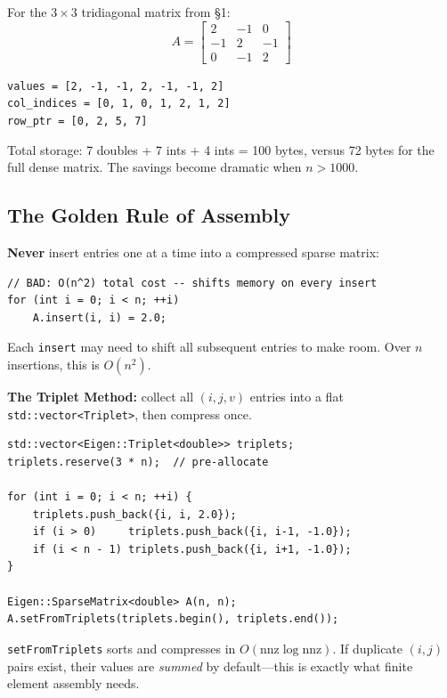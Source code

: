 \begin{example}
For the $3\times 3$ tridiagonal matrix from \S1:
\[
    A = \begin{bmatrix} 2 & -1 & 0 \\ -1 & 2 & -1 \\ 0 & -1 & 2 \end{bmatrix}
\]
\begin{center}
\texttt{values = [2, -1, -1, 2, -1, -1, 2]} \\
\texttt{col\_indices = [0, 1, 0, 1, 2, 1, 2]} \\
\texttt{row\_ptr = [0, 2, 5, 7]}
\end{center}
Total storage: 7 doubles + 7 ints + 4 ints = 100 bytes, versus
72 bytes for the full dense matrix.  The savings become dramatic
when $n > 1000$.
\end{example}

\subsection{The Golden Rule of Assembly}

\begin{warningbox}
\textbf{Never} insert entries one at a time into a compressed sparse matrix:
\begin{lstlisting}
// BAD: O(n^2) total cost -- shifts memory on every insert
for (int i = 0; i < n; ++i)
    A.insert(i, i) = 2.0;
\end{lstlisting}
Each \texttt{insert} may need to shift all subsequent entries to make room.
Over $n$ insertions, this is $O(n^2)$.
\end{warningbox}

\textbf{The Triplet Method:} collect all $(i, j, v)$ entries into a flat
\texttt{std::vector<Triplet>}, then compress once.

\begin{lstlisting}
std::vector<Eigen::Triplet<double>> triplets;
triplets.reserve(3 * n);  // pre-allocate

for (int i = 0; i < n; ++i) {
    triplets.push_back({i, i, 2.0});
    if (i > 0)     triplets.push_back({i, i-1, -1.0});
    if (i < n - 1) triplets.push_back({i, i+1, -1.0});
}

Eigen::SparseMatrix<double> A(n, n);
A.setFromTriplets(triplets.begin(), triplets.end());
\end{lstlisting}

\texttt{setFromTriplets} sorts and compresses in $O(\text{nnz}\log\text{nnz})$.
If duplicate $(i,j)$ pairs exist, their values are \emph{summed} by default---this is exactly what finite element assembly needs.

